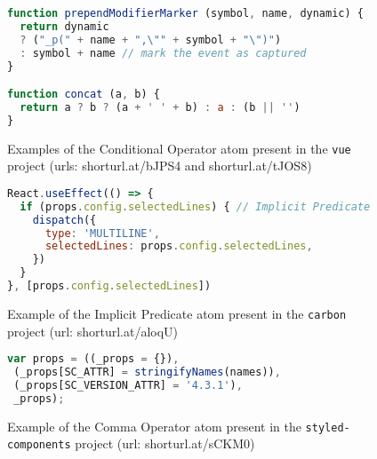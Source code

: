 \begin{figure}[htb]
  \begin{lstlisting}[language=JavaScript]
function prependModifierMarker (symbol, name, dynamic) {
  return dynamic
  ? ("_p(" + name + ",\"" + symbol + "\")")
  : symbol + name // mark the event as captured
}

function concat (a, b) {
  return a ? b ? (a + ' ' + b) : a : (b || '')
}
  \end{lstlisting}
  \caption{Examples of the Conditional Operator atom present in the \texttt{vue} project (urls: shorturl.at/bJPS4 and shorturl.at/tJOS8)}
   \label{lst:conditional-operator-sample}
\end{figure}

\begin{figure}[htb]
  \begin{lstlisting}[language=JavaScript]
React.useEffect(() => {
  if (props.config.selectedLines) { // Implicit Predicate
    dispatch({
      type: 'MULTILINE',
      selectedLines: props.config.selectedLines,
    })
  }
}, [props.config.selectedLines])
  \end{lstlisting}
  \caption{Example of the Implicit Predicate atom present in the \texttt{carbon} project (url: shorturl.at/aloqU)}
  \label{lst:implicit-predicate-sample}
\end{figure}

\begin{figure}[htb]
  \begin{lstlisting}[language=JavaScript]
var props = ((_props = {}),
 (_props[SC_ATTR] = stringifyNames(names)),
 (_props[SC_VERSION_ATTR] = '4.3.1'),
 _props);
  \end{lstlisting}
  \caption{Example of the Comma Operator atom present in the \texttt{styled-components} project (url: shorturl.at/sCKM0)}
  \label{lst:comma-operator-sample}
\end{figure}




